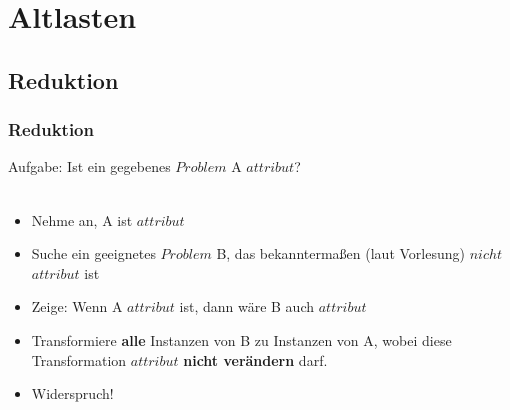 




\section{Altlasten}
\subsection{Reduktion}
\begin{frame}
\frametitle{Reduktion}
Aufgabe: Ist ein gegebenes $Problem$ A $attribut$?~\\~\\
\begin{itemize}
\item Nehme an, A ist $attribut$
\item Suche ein geeignetes $Problem$ B, das bekanntermaßen (laut Vorlesung) $nicht$ $attribut$ ist
\item Zeige: Wenn A $attribut$ ist, dann wäre B auch $attribut$
\item Transformiere \textbf{alle} Instanzen von B zu Instanzen von A, wobei diese Transformation $attribut$ \textbf{nicht verändern} darf.
\item Widerspruch!
\end{itemize}
\end{frame}

